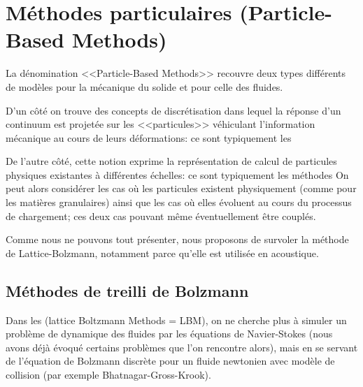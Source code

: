 \medskip
\section{Méthodes particulaires (Particle-Based Methods)}\label{Sec-PBM}

La dénomination <<Particle-Based Methods>> recouvre deux types différents de modèles
pour la mécanique du solide et pour celle des fluides.

D'un côté on trouve des concepts de discrétisation dans lequel la réponse d'un continuum 
est projetée sur les <<particules>> véhiculant l'information mécanique au cours de leurs déformations:
ce sont typiquement les 

De l'autre côté, cette notion exprime la représentation de calcul de particules physiques existantes 
à différentes échelles: ce sont typiquement les méthodes 
On peut alors considérer les cas où les particules existent physiquement (comme pour les matières granulaires)
ainsi que les cas où elles évoluent au cours du processus de chargement; ces deux cas pouvant même
éventuellement être couplés.

\medskip
Comme nous ne pouvons tout présenter, nous proposons de survoler la méthode
de Lattice-Bolzmann, 
notamment parce qu'elle est utilisée en acoustique.

\medskip
\subsection{Méthodes de treilli de Bolzmann}

Dans les  (lattice Boltzmann Methods = LBM), on ne cherche 
plus à simuler un problème de dynamique des fluides par les équations de 
Navier-Stokes 
(nous avons déjà évoqué certains problèmes que l'on rencontre alors), mais en se servant de
l'équation de Bolzmann 
discrète pour un fluide newtonien avec modèle de collision (par exemple 
Bhatnagar-Gross-Krook).

